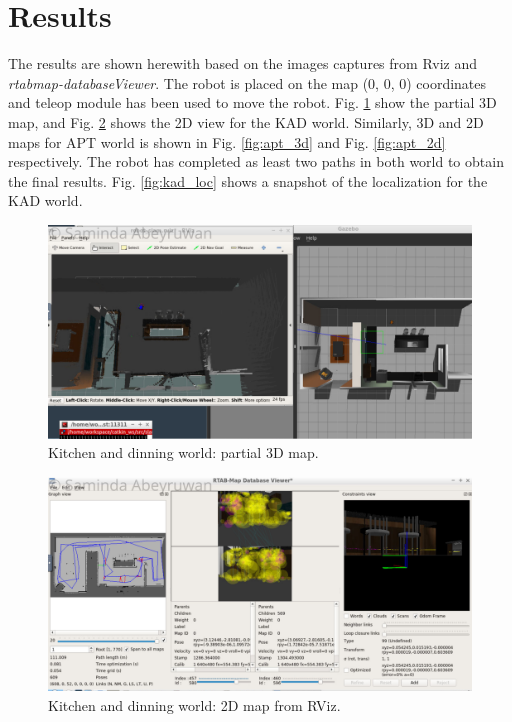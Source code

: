 \documentclass[10pt,journal,compsoc]{IEEEtran}
\begin{document}
\section{Results}

The results are shown herewith based on the images captures from Rviz and \textit{rtabmap-databaseViewer}. The robot is placed on the map (0, 0, 0) coordinates and teleop module has been used to move the robot. Fig. \ref{fig:kad_3d} show the partial 3D map, and Fig. \ref{fig:kad_2d} shows the 2D view for the KAD world. Similarly, 3D and 2D maps for APT world is shown in Fig. \ref{fig:apt_3d} and Fig. \ref{fig:apt_2d} respectively.  The robot has completed as least two paths in both world to obtain the final results.  Fig. \ref{fig:kad_loc} shows a snapshot of the localization for the KAD world.  

\begin{figure}[thpb]
      \centering
      \includegraphics[width=\linewidth]{kad_3d_w}
      \caption{Kitchen and dinning world: partial 3D map.}
      \label{fig:kad_3d}
\end{figure}

\begin{figure}[thpb]
      \centering
      \includegraphics[width=\linewidth]{kad_2d_w}
      \caption{Kitchen and dinning world: 2D map from RViz.}
      \label{fig:kad_2d}
\end{figure}
\end{document}

